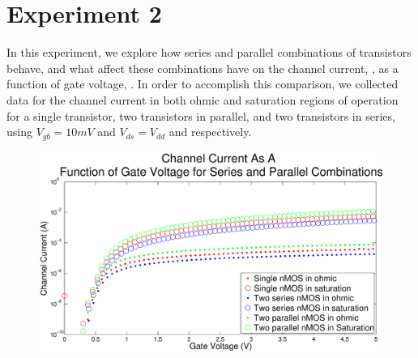 \section*{Experiment 2}
In this experiment, we explore how series and parallel combinations of \nMOS transistors behave, 
and what affect these combinations have on the channel current, \Isat, as a function of gate voltage,
\Vg. In order to accomplish this comparison, we collected data for the channel current in both ohmic 
and saturation regions of operation for a single \nMOS transistor, two transistors in parallel, and
two transistors in series, using $V_{gb} = 10mV$ and $ V_{ds} = V_{dd}$ and respectively.

\begin{figure}[H]
\centering
\includegraphics[width=\linewidth]{../Figures/Experiment2Currents.eps}
\caption{}
\label{fig:nmosdia}
\end{figure}